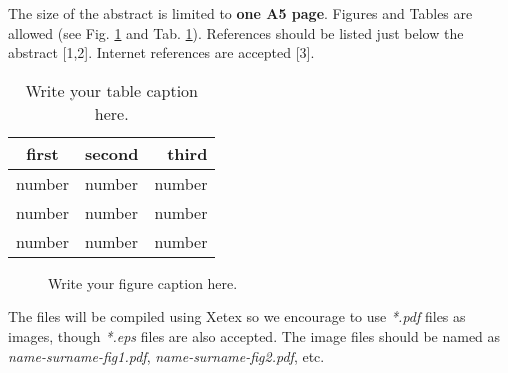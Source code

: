 \documentclass[10pt,a5paper]{article}
\begin{document}
\begin{small}
The size of the abstract is limited to \textbf{one A5 page}.
Figures and Tables are allowed (see Fig. \ref{fig:1} and Tab.
\ref{tab:1}). References should be listed just below the abstract
[1,2]. Internet references are accepted [3].
\begin{table}[!ht]
\vspace*{-.4cm}
\begin{center}
\caption{\small{Write your table caption here.}}
\label{tab:1}                                                  %
\begin{tabular}{@{}clr@{}}
\hline \small{first} & \small{second} & \small{third}\\
\hline \small{number} & \small{number} & \small{number} \\
\small{number} & \small{number} & \small{number} \\
\small{number} & \small{number} & \small{number} \\
\hline
\end{tabular}
\end{center}
\vspace*{-.5cm}
\end{table}
\begin{figure}[!h]
\vspace*{-.5cm}
\begin{center}
\caption{\small{Write your figure caption here.}}
\label{fig:1}                                                   %
\end{center}
\vspace*{-.5cm}
\end{figure}
The files will be compiled using Xetex so we encourage to use \textit{*.pdf} files as images, though \textit{*.eps} files are also accepted. The image files should be named as \textit{name-surname-fig1.pdf}, \textit{name-surname-fig2.pdf}, etc.


\end{small}
\end{document}
